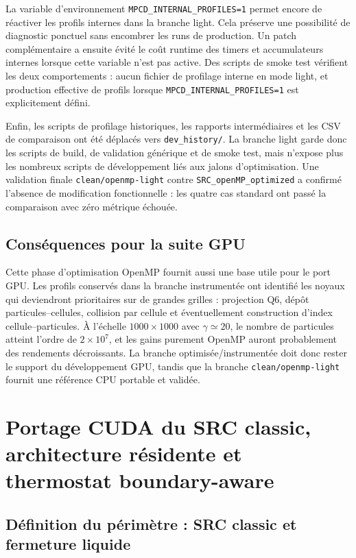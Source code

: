 \documentclass[11pt,a4paper]{article}
\begin{document}
La variable d'environnement \texttt{MPCD\_INTERNAL\_PROFILES=1} permet encore de réactiver les profils internes dans la branche light. Cela préserve une possibilité de diagnostic ponctuel sans encombrer les runs de production. Un patch complémentaire a ensuite évité le coût runtime des timers et accumulateurs internes lorsque cette variable n'est pas active. Des scripts de smoke test vérifient les deux comportements : aucun fichier de profilage interne en mode light, et production effective de profils lorsque \texttt{MPCD\_INTERNAL\_PROFILES=1} est explicitement défini.

Enfin, les scripts de profilage historiques, les rapports intermédiaires et les CSV de comparaison ont été déplacés vers \texttt{dev\_history/}. La branche light garde donc les scripts de build, de validation générique et de smoke test, mais n'expose plus les nombreux scripts de développement liés aux jalons d'optimisation. Une validation finale \texttt{clean/openmp-light} contre \texttt{SRC\_openMP\_optimized} a confirmé l'absence de modification fonctionnelle : les quatre cas standard ont passé la comparaison avec zéro métrique échouée.

\subsection{Conséquences pour la suite GPU}

Cette phase d'optimisation OpenMP fournit aussi une base utile pour le port GPU. Les profils conservés dans la branche instrumentée ont identifié les noyaux qui deviendront prioritaires sur de grandes grilles : projection Q6, dépôt particules--cellules, collision par cellule et éventuellement construction d'index cellule--particules. À l'échelle \(1000\times1000\) avec \(\gamma\simeq20\), le nombre de particules atteint l'ordre de \(2\times10^7\), et les gains purement OpenMP auront probablement des rendements décroissants. La branche optimisée/instrumentée doit donc rester le support du développement GPU, tandis que la branche \texttt{clean/openmp-light} fournit une référence CPU portable et validée.



\section{Portage CUDA du SRC classic, architecture résidente et thermostat boundary-aware}

\subsection{Définition du périmètre : SRC classic et fermeture liquide}
\end{document}
